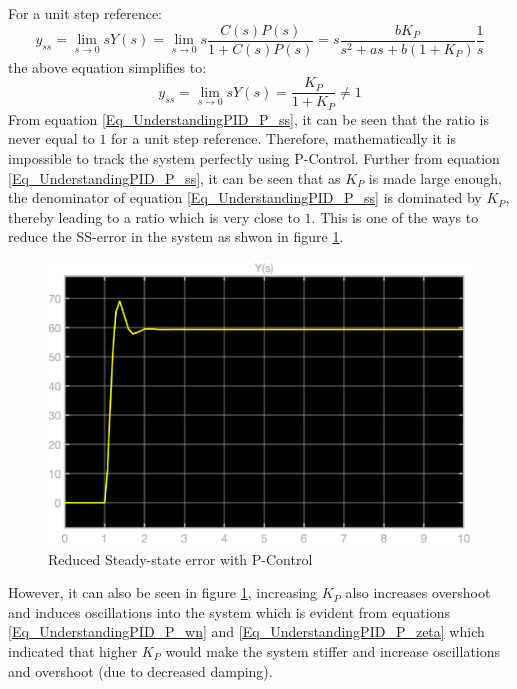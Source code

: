 For a unit step reference:
\begin{equation}
	y_{ss} = \lim_{s\to 0} s Y(s) = \lim_{s\to 0} s \frac{C(s)P(s)}{1 + C(s)P(s)} = s \frac{b K_P}{s^2 + as + b(1 + K_P)} \frac{1}{s}
\end{equation}
the above equation simplifies to:
\begin{equation}\label{Eq_UnderstandingPID_P_ss}
	y_{ss} = \lim_{s\to 0} s Y(s) = \frac{K_P}{1 + K_P} \neq 1
\end{equation}
From equation \eqref{Eq_UnderstandingPID_P_ss}, it can be seen that the ratio is never equal to $1$ for a unit step reference. Therefore, mathematically it is impossible to track the system perfectly using P-Control. Further from equation \eqref{Eq_UnderstandingPID_P_ss}, it can be seen that as $K_P$ is made large enough, the denominator of equation \eqref{Eq_UnderstandingPID_P_ss} is dominated by $K_P$, thereby leading to a ratio which is very close to $1$. This is one of the ways to reduce the SS-error in the system as shwon in figure \ref{Fig_UnderstandingPID_P_ss_bigK}.
\begin{figure}[h!]
	\centering
	\includegraphics[width=\linewidth]{Bilder/UnderstandingPID_P_bigK.eps}
	\caption{Reduced Steady-state error with P-Control}
	\label{Fig_UnderstandingPID_P_ss_bigK}
\end{figure}
\newpage
However, it can also be seen in figure \ref{Fig_UnderstandingPID_P_ss_bigK}, increasing $K_P$ also increases overshoot and induces oscillations into the system which is evident from equations \eqref{Eq_UnderstandingPID_P_wn} and \eqref{Eq_UnderstandingPID_P_zeta} which indicated that higher $K_P$ would make the system stiffer and increase oscillations and overshoot (due to decreased damping).

